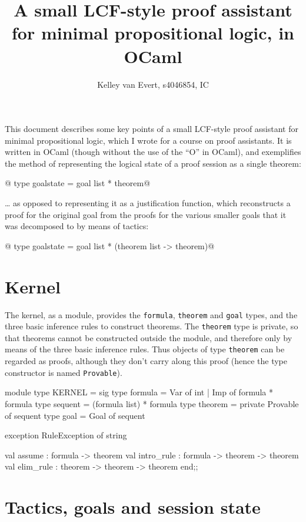 \documentclass[a4paper,11pt]{article} %
\title{A small LCF-style proof assistant for minimal propositional logic, in OCaml}
\author{Kelley van Evert, s4046854, IC}
\begin{document}
\maketitle

This document describes some key points of a small LCF-style proof assistant for minimal propositional logic, which I wrote for a course on proof assistants. It is written in OCaml (though without the use of the “O” in OCaml), and exemplifies the method of representing the logical state of a proof session as a single theorem:

@  type goalstate = goal list * theorem@

… as opposed to representing it as a justification function, which reconstructs a proof for the original goal from the proofs for the various smaller goals that it was decomposed to by means of tactics:

@  type goalstate = goal list * (theorem list -> theorem)@

\section{Kernel}

The kernel, as a module, provides the \texttt{formula}, \texttt{theorem} and \texttt{goal} types, and the three basic inference rules to construct theorems. The \texttt{theorem} type is private, so that theorems cannot be constructed outside the module, and therefore only by means of the three basic inference rules. Thus objects of type \texttt{theorem} can be regarded as proofs, although they don't carry along this proof (hence the type constructor is named \texttt{Provable}).

\begin{ocamlcode}
  module type KERNEL =
    sig
      type formula = Var of int | Imp of formula * formula
      type sequent = (formula list) * formula
      type theorem = private Provable of sequent
      type goal = Goal of sequent

      exception RuleException of string

      val assume : formula -> theorem
      val intro_rule : formula -> theorem -> theorem
      val elim_rule : theorem -> theorem -> theorem
    end;;
\end{ocamlcode}


\section{Tactics, goals and session state}
\end{document}
